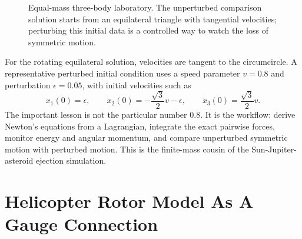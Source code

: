 \begin{figure}[htbp]
\centering
{}
\caption{Equal-mass three-body laboratory. The unperturbed comparison solution
starts from an equilateral triangle with tangential velocities; perturbing this
initial data is a controlled way to watch the loss of symmetric motion.}
\label{fig:lab-three-body-initial-data}
\end{figure}
\FloatBarrier

For the rotating equilateral solution, velocities are tangent to the
circumcircle. A representative perturbed initial condition uses a speed
parameter \(v=0.8\) and perturbation \(\epsilon=0.05\), with initial velocities
such as
\[
  \dot x_1(0)=\epsilon,\qquad
  \dot x_2(0)=-\frac{\sqrt3}{2}v-\epsilon,\qquad
  \dot x_3(0)=\frac{\sqrt3}{2}v.
\]
The important lesson is not the particular number \(0.8\). It is the workflow:
derive Newton's equations from a Lagrangian, integrate the exact pairwise
forces, monitor energy and angular momentum, and compare unperturbed symmetric
motion with perturbed motion. This is the finite-mass cousin of the
Sun-Jupiter-asteroid ejection simulation.

\section{Helicopter Rotor Model As A Gauge Connection}
\label{sec:lab-helicopter-gauge}

